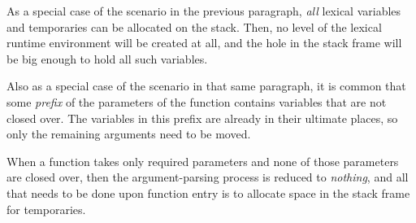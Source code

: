 As a special case of the scenario in the previous paragraph,
\emph{all} lexical variables and temporaries can be allocated on the
stack.  Then, no level of the lexical runtime environment will be
created at all, and the hole in the stack frame will be big enough to
hold all such variables.

Also as a special case of the scenario in that same paragraph, it is
common that some \emph{prefix} of the parameters of the function
contains variables that are not closed over.  The variables in this
prefix are already in their ultimate places, so only the remaining
arguments need to be moved.

When a function takes only required parameters and none of those
parameters are closed over, then the argument-parsing process is
reduced to \emph{nothing}, and all that needs to be done upon function
entry is to allocate space in the stack frame for temporaries.

